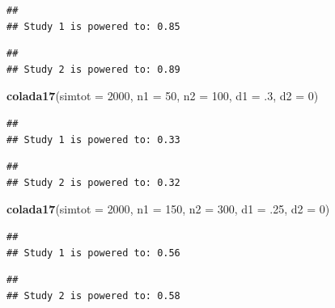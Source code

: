 \documentclass[
]{book}
\newenvironment{Shaded}{\begin{snugshade}}{\end{snugshade}}
\newcommand{\CommentTok}[1]{\textcolor[rgb]{0.56,0.35,0.01}{\textit{#1}}}
\newcommand{\DataTypeTok}[1]{\textcolor[rgb]{0.13,0.29,0.53}{#1}}
\newcommand{\DecValTok}[1]{\textcolor[rgb]{0.00,0.00,0.81}{#1}}
\newcommand{\FloatTok}[1]{\textcolor[rgb]{0.00,0.00,0.81}{#1}}
\newcommand{\KeywordTok}[1]{\textcolor[rgb]{0.13,0.29,0.53}{\textbf{#1}}}
\newcommand{\NormalTok}[1]{#1}
\newcommand{\OperatorTok}[1]{\textcolor[rgb]{0.81,0.36,0.00}{\textbf{#1}}}
\newcommand{\StringTok}[1]{\textcolor[rgb]{0.31,0.60,0.02}{#1}}
\begin{document}
\begin{verbatim}
## 
## Study 1 is powered to: 0.85
\end{verbatim}

\begin{verbatim}
## 
## Study 2 is powered to: 0.89
\end{verbatim}

\begin{Shaded}
\begin{Highlighting}[]
  \KeywordTok{colada17}\NormalTok{(}\DataTypeTok{simtot =} \DecValTok{2000}\NormalTok{, }\DataTypeTok{n1 =} \DecValTok{50}\NormalTok{, }\DataTypeTok{n2 =} \DecValTok{100}\NormalTok{, }\DataTypeTok{d1 =} \FloatTok{.3}\NormalTok{, }\DataTypeTok{d2 =} \DecValTok{0}\NormalTok{)}
\end{Highlighting}
\end{Shaded}

\begin{verbatim}
## 
## Study 1 is powered to: 0.33
\end{verbatim}

\begin{verbatim}
## 
## Study 2 is powered to: 0.32
\end{verbatim}

\begin{Shaded}
\begin{Highlighting}[]
  \KeywordTok{colada17}\NormalTok{(}\DataTypeTok{simtot =} \DecValTok{2000}\NormalTok{, }\DataTypeTok{n1 =} \DecValTok{150}\NormalTok{, }\DataTypeTok{n2 =} \DecValTok{300}\NormalTok{, }\DataTypeTok{d1 =} \FloatTok{.25}\NormalTok{, }\DataTypeTok{d2 =} \DecValTok{0}\NormalTok{)}
\end{Highlighting}
\end{Shaded}

\begin{verbatim}
## 
## Study 1 is powered to: 0.56
\end{verbatim}

\begin{verbatim}
## 
## Study 2 is powered to: 0.58
\end{verbatim}

\begin{Shaded}
\end{Shaded}
\end{document}
